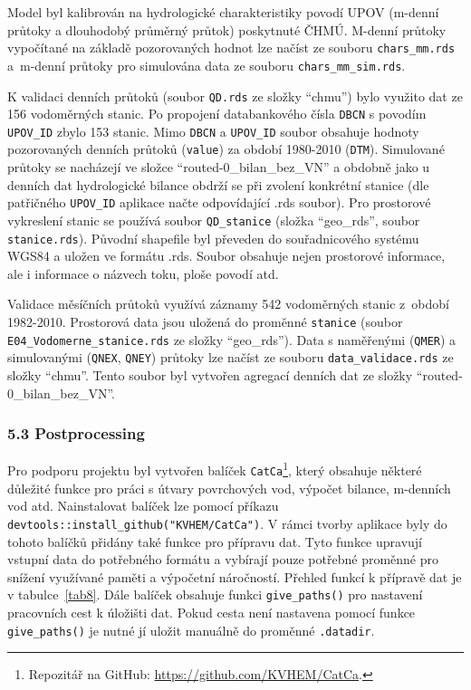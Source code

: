 \documentclass[12pt,]{article}
\let\rmarkdownfootnote\footnote%
\def\footnote{\protect\rmarkdownfootnote}
\begin{document}
\qquad Model byl kalibrován na hydrologické charakteristiky povodí UPOV
(m-denní průtoky a dlouhodobý průměrný průtok) poskytnuté ČHMÚ. M-denní
průtoky vypočítané na základě pozorovaných hodnot lze načíst ze souboru
\texttt{chars\_mm.rds} a~m-denní průtoky pro simulována data ze souboru
\texttt{chars\_mm\_sim.rds}.

\qquad K validaci denních průtoků (soubor \texttt{QD.rds} ze složky
\enquote{chmu}) bylo využito dat ze 156 vodoměrných stanic. Po propojení
databankového čísla \texttt{DBCN} s povodím \texttt{UPOV\_ID} zbylo 153
stanic. Mimo \texttt{DBCN} a \texttt{UPOV\_ID} soubor obsahuje hodnoty
pozorovaných denních průtoků (\texttt{value}) za období 1980-2010
(\texttt{DTM}). Simulované průtoky se nacházejí ve složce
\enquote{routed-0\_bilan\_bez\_VN} a obdobně jako u denních dat
hydrologické bilance obdrží se při zvolení konkrétní stanice (dle
patřičného \texttt{UPOV\_ID} aplikace načte odpovídající .rds soubor).
Pro prostorové vykreslení stanic se používá soubor \texttt{QD\_stanice}
(složka \enquote{geo\_rds}, soubor \texttt{stanice.rds}). Původní
shapefile byl převeden do souřadnicového systému WGS84 a uložen ve
formátu .rds. Soubor obsahuje nejen prostorové informace, ale i
informace o názvech toku, ploše povodí atd.

\qquad Validace měsíčních průtoků využívá záznamy 542 vodoměrných stanic
z~období 1982-2010. Prostorová data jsou uložená do proměnné
\texttt{stanice} (soubor \texttt{E04\_Vodomerne\_stanice.rds} ze složky
\enquote{geo\_rds}). Data s naměřenými (\texttt{QMER}) a simulovanými
(\texttt{QNEX}, \texttt{QNEY}) průtoky lze načíst ze souboru
\texttt{data\_validace.rds} ze složky \enquote{chmu}. Tento soubor byl
vytvořen agregací denních dat ze složky
\enquote{routed-0\_bilan\_bez\_VN}.

\subsubsection{5.3 Postprocessing}\label{postprocessing}

\qquad Pro podporu projektu byl vytvořen balíček
\texttt{CatCa}\footnote{Repozitář na GitHub:
  \url{https://github.com/KVHEM/CatCa}.}, který obsahuje některé
důležité funkce pro práci s útvary povrchových vod, výpočet bilance,
m-denních vod atd. Nainstalovat balíček lze pomocí příkazu
\texttt{devtools::install\_github("KVHEM/CatCa")}. V rámci tvorby
aplikace byly do tohoto balíčků přidány také funkce pro přípravu dat.
Tyto funkce upravují vstupní data do potřebného formátu a vybírají pouze
potřebné proměnné pro snížení využívané paměti a výpočetní náročností.
Přehled funkcí k přípravě dat je v tabulce~\ref{tab8}. Dále balíček
obsahuje funkci \texttt{give\_paths()} pro nastavení pracovních cest k
úložišti dat. Pokud cesta není nastavena pomocí funkce
\texttt{give\_paths()} je nutné jí uložit manuálně do proměnné
\texttt{.datadir}.
\end{document}
